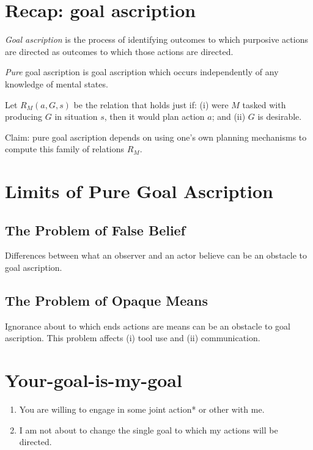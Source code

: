 \documentclass[11pt]{extarticle}
\begin{document}
\begin{multicols}{3}
\section{Recap: goal ascription}

\newcommand{\dfGoalAscription}{\emph{Goal ascription} is the process of identifying outcomes to which purposive actions are directed as outcomes to which those actions are directed.}

\dfGoalAscription{}

\emph{Pure} goal ascription is goal ascription which occurs independently of any knowledge of mental states.

Let $R{_M}(a,G,s)$ be the relation that holds just if: (i) were $M$  tasked with producing $G$ in situation $s$, then it would plan action $a$; and (ii) $G$ is desirable.

Claim: pure goal ascription depends on using one's own planning mechanisms to compute this family of relations $R{_M}$.


\section{Limits of Pure Goal Ascription}



\subsection{The Problem of False Belief}
Differences between what an observer and an actor believe can be an obstacle to goal ascription.


\subsection{The Problem of Opaque Means}
Ignorance about to which ends actions are means can be an obstacle to goal ascription. 
This problem affects (i) tool use and (ii) communication.


\section{Your-goal-is-my-goal}
\begin{enumerate}
\item You are willing to engage in some joint action* or other with me.

\item I am not about to change the single goal to which my actions will be directed.


\end{enumerate}
\end{multicols}
\end{document}
